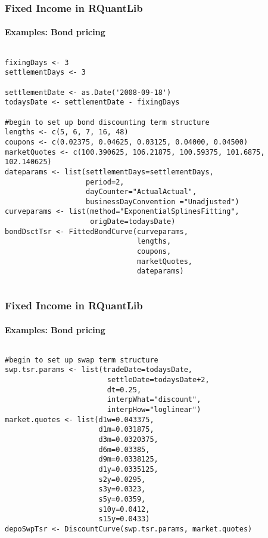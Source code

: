 \documentclass[smaller,compress]{beamer}
\begin{document}
\begin{frame}[fragile]
	\frametitle{Fixed Income in RQuantLib}
	\framesubtitle{Examples: Bond pricing}	
\begin{columns}[c] %
			\lstset{language=R,basicstyle=\tiny}
				\begin{lstlisting}
fixingDays <- 3
settlementDays <- 3

settlementDate <- as.Date('2008-09-18')
todaysDate <- settlementDate - fixingDays

#begin to set up bond discounting term structure
lengths <- c(5, 6, 7, 16, 48)
coupons <- c(0.02375, 0.04625, 0.03125, 0.04000, 0.04500)
marketQuotes <- c(100.390625, 106.21875, 100.59375, 101.6875, 102.140625)
dateparams <- list(settlementDays=settlementDays,
                   period=2, 
                   dayCounter="ActualActual", 
                   businessDayConvention ="Unadjusted")
curveparams <- list(method="ExponentialSplinesFitting", 
                    origDate=todaysDate)
bondDsctTsr <- FittedBondCurve(curveparams,
                               lengths,
                               coupons,
                               marketQuotes,
                               dateparams)
\end{lstlisting}

\lstset{language=C++,basicstyle=\tiny}
	\begin{lstlisting}
	
	\end{lstlisting}
\end{columns}
\end{frame}

\begin{frame}[fragile]
	\frametitle{Fixed Income in RQuantLib}
	\framesubtitle{Examples: Bond pricing}	
\begin{columns}[c] %
			\lstset{language=R,basicstyle=\tiny}
				\begin{lstlisting}
#begin to set up swap term structure
swp.tsr.params <- list(tradeDate=todaysDate,
                        settleDate=todaysDate+2,
                        dt=0.25,
                        interpWhat="discount",
                        interpHow="loglinear")
market.quotes <- list(d1w=0.043375,
                      d1m=0.031875,
                      d3m=0.0320375,
                      d6m=0.03385,
                      d9m=0.0338125,
                      d1y=0.0335125,                      
                      s2y=0.0295,
                      s3y=0.0323,
                      s5y=0.0359,
                      s10y=0.0412,
                      s15y=0.0433)
depoSwpTsr <- DiscountCurve(swp.tsr.params, market.quotes)
\end{lstlisting}

\end{columns}
\end{frame}
\end{document}
